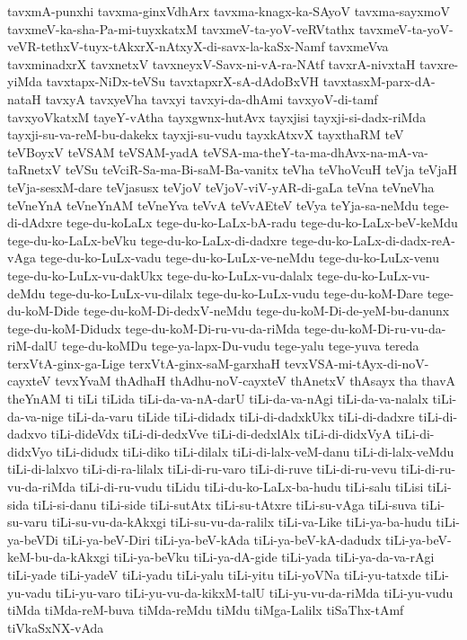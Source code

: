 {tavxmA-punxhi
tavxma-ginxVdhArx
tavxma-knagx-ka-SAyoV
tavxma-sayxmoV
tavxmeV-ka-sha-Pa-mi-tuyxkatxM
tavxmeV-ta-yoV-veRVtathx
tavxmeV-ta-yoV-veVR-tethxV-tuyx-tAkxrX-nAtxyX-di-savx-la-kaSx-Namf
tavxmeVva
tavxminadxrX
tavxnetxV
tavxneyxV-Savx-ni-vA-ra-NAtf
tavxrA-nivxtaH
tavxre-yiMda
tavxtapx-NiDx-teVSu
tavxtapxrX-sA-dAdoBxVH
tavxtasxM-parx-dA-nataH
tavxyA
tavxyeVha
tavxyi
tavxyi-da-dhAmi
tavxyoV-di-tamf
tavxyoVkatxM
tayeY-vAtha
tayxgwnx-hutAvx
tayxjisi
tayxji-si-dadx-riMda
tayxji-su-va-reM-bu-dakekx
tayxji-su-vudu
tayxkAtxvX
tayxthaRM
teV
teVBoyxV
teVSAM
teVSAM-yadA
teVSA-ma-theY-ta-ma-dhAvx-na-mA-va-taRnetxV
teVSu
teVciR-Sa-ma-Bi-saM-Ba-vanitx
teVha
teVhoVcuH
teVja
teVjaH
teVja-sesxM-dare
teVjasusx
teVjoV
teVjoV-viV-yAR-di-gaLa
teVna
teVneVha
teVneYnA
teVneYnAM
teVneYva
teVvA
teVvAEteV
teVya
teYja-sa-neMdu
tege-di-dAdxre
tege-du-koLaLx
tege-du-ko-LaLx-bA-radu
tege-du-ko-LaLx-beV-keMdu
tege-du-ko-LaLx-beVku
tege-du-ko-LaLx-di-dadxre
tege-du-ko-LaLx-di-dadx-reA-vAga
tege-du-ko-LuLx-vadu
tege-du-ko-LuLx-ve-neMdu
tege-du-ko-LuLx-venu
tege-du-ko-LuLx-vu-dakUkx
tege-du-ko-LuLx-vu-dalalx
tege-du-ko-LuLx-vu-deMdu
tege-du-ko-LuLx-vu-dilalx
tege-du-ko-LuLx-vudu
tege-du-koM-Dare
tege-du-koM-Dide
tege-du-koM-Di-dedxV-neMdu
tege-du-koM-Di-de-yeM-bu-danunx
tege-du-koM-Didudx
tege-du-koM-Di-ru-vu-da-riMda
tege-du-koM-Di-ru-vu-da-riM-dalU
tege-du-koMDu
tege-ya-lapx-Du-vudu
tege-yalu
tege-yuva
tereda
terxVtA-ginx-ga-Lige
terxVtA-ginx-saM-garxhaH
tevxVSA-mi-tAyx-di-noV-cayxteV
tevxYvaM
thAdhaH
thAdhu-noV-cayxteV
thAnetxV
thAsayx
tha
thavA
theYnAM
ti
tiLi
tiLida
tiLi-da-va-nA-darU
tiLi-da-va-nAgi
tiLi-da-va-nalalx
tiLi-da-va-nige
tiLi-da-varu
tiLide
tiLi-didadx
tiLi-di-dadxkUkx
tiLi-di-dadxre
tiLi-di-dadxvo
tiLi-dideVdx
tiLi-di-dedxVve
tiLi-di-dedxlAlx
tiLi-di-didxVyA
tiLi-di-didxVyo
tiLi-didudx
tiLi-diko
tiLi-dilalx
tiLi-di-lalx-veM-danu
tiLi-di-lalx-veMdu
tiLi-di-lalxvo
tiLi-di-ra-lilalx
tiLi-di-ru-varo
tiLi-di-ruve
tiLi-di-ru-vevu
tiLi-di-ru-vu-da-riMda
tiLi-di-ru-vudu
tiLidu
tiLi-du-ko-LaLx-ba-hudu
tiLi-salu
tiLisi
tiLi-sida
tiLi-si-danu
tiLi-side
tiLi-sutAtx
tiLi-su-tAtxre
tiLi-su-vAga
tiLi-suva
tiLi-su-varu
tiLi-su-vu-da-kAkxgi
tiLi-su-vu-da-ralilx
tiLi-va-Like
tiLi-ya-ba-hudu
tiLi-ya-beVDi
tiLi-ya-beV-Diri
tiLi-ya-beV-kAda
tiLi-ya-beV-kA-dadudx
tiLi-ya-beV-keM-bu-da-kAkxgi
tiLi-ya-beVku
tiLi-ya-dA-gide
tiLi-yada
tiLi-ya-da-va-rAgi
tiLi-yade
tiLi-yadeV
tiLi-yadu
tiLi-yalu
tiLi-yitu
tiLi-yoVNa
tiLi-yu-tatxde
tiLi-yu-vadu
tiLi-yu-varo
tiLi-yu-vu-da-kikxM-talU
tiLi-yu-vu-da-riMda
tiLi-yu-vudu
tiMda
tiMda-reM-buva
tiMda-reMdu
tiMdu
tiMga-Lalilx
tiSaThx-tAmf
tiVkaSxNX-vAda
}
